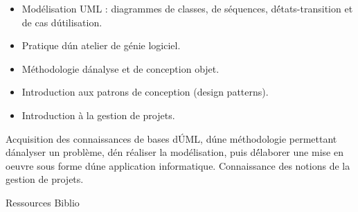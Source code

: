 {
\begin{itemize} 
  \item Modélisation UML : diagrammes de classes, de séquences, d\'états-transition et de cas d\'utilisation.
  \item Pratique d\'un atelier de génie logiciel.
  \item Méthodologie d\'analyse et de conception objet.
  \item Introduction aux patrons de conception (design patterns).
  \item Introduction à la gestion de projets.
\end{itemize} 
} 
{} 
{\begin{itemize} 
  \ObjItem Acquisition des connaissances de bases d\'UML, d\'une méthodologie permettant d\'analyser un problème, d\'en réaliser la modélisation, puis d\'élaborer une mise en oeuvre sous forme d\'une application informatique. 
  \ObjItem Connaissance des notions de la gestion de projets. 
\end{itemize} 
} 
{Ressources} 
{Biblio} 
 
\vfill

